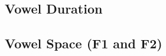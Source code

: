 \documentclass[11pt]{article}
\begin{document}
\subsection{Vowel Duration}

\subsection*{Vowel Space (F1 and F2)}

%
%
\end{document}
